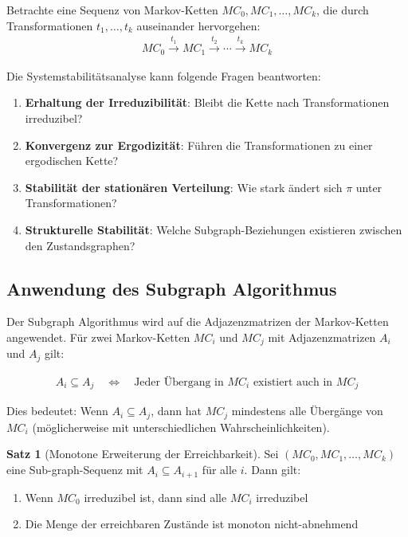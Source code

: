 \documentclass[a4paper,12pt]{article}
\theoremstyle{definition}
\newtheorem{satz}{Satz}
\begin{document}
Betrachte eine Sequenz von Markov-Ketten $MC_0, MC_1, \ldots, MC_k$, die durch Transformationen $t_1, \ldots, t_k$ auseinander hervorgehen:
\begin{align}
	MC_0 \xrightarrow{t_1} MC_1 \xrightarrow{t_2} \cdots \xrightarrow{t_k} MC_k
\end{align}

Die Systemstabilitätsanalyse kann folgende Fragen beantworten:

\begin{enumerate}
	\item \textbf{Erhaltung der Irreduzibilität}: Bleibt die Kette nach Transformationen irreduzibel?
	
	\item \textbf{Konvergenz zur Ergodizität}: Führen die Transformationen zu einer ergodischen Kette?
	
	\item \textbf{Stabilität der stationären Verteilung}: Wie stark ändert sich $\pi$ unter Transformationen?
	
	\item \textbf{Strukturelle Stabilität}: Welche Subgraph-Beziehungen existieren zwischen den Zustandsgraphen?
\end{enumerate}

\subsection{Anwendung des Subgraph Algorithmus}

Der Subgraph Algorithmus wird auf die Adjazenzmatrizen der Markov-Ketten angewendet. Für zwei Markov-Ketten $MC_i$ und $MC_j$ mit Adjazenzmatrizen $A_i$ und $A_j$ gilt:

\begin{align}
	A_i \subseteq A_j \quad \Leftrightarrow \quad \text{Jeder Übergang in } MC_i \text{ existiert auch in } MC_j
\end{align}

Dies bedeutet: Wenn $A_i \subseteq A_j$, dann hat $MC_j$ mindestens alle Übergänge von $MC_i$ (möglicherweise mit unterschiedlichen Wahrscheinlichkeiten).

\begin{satz}[Monotone Erweiterung der Erreichbarkeit]
	Sei $(MC_0, MC_1, \ldots, MC_k)$ eine Sub-graph-Sequenz mit $A_i \subseteq A_{i+1}$ für alle $i$. Dann gilt:
	\begin{enumerate}
		\item Wenn $MC_0$ irreduzibel ist, dann sind alle $MC_i$ irreduzibel
		\item Die Menge der erreichbaren Zustände ist monoton nicht-abnehmend
	\end{enumerate}
\end{satz}
\end{document}
